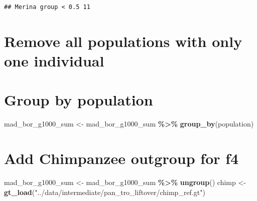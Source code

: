 \documentclass[
]{article}
\newenvironment{Shaded}{\begin{snugshade}}{\end{snugshade}}
\newcommand{\DecValTok}[1]{\textcolor[rgb]{0.00,0.00,0.81}{#1}}
\newcommand{\FunctionTok}[1]{\textcolor[rgb]{0.13,0.29,0.53}{\textbf{#1}}}
\newcommand{\NormalTok}[1]{#1}
\newcommand{\OtherTok}[1]{\textcolor[rgb]{0.56,0.35,0.01}{#1}}
\newcommand{\SpecialCharTok}[1]{\textcolor[rgb]{0.81,0.36,0.00}{\textbf{#1}}}
\newcommand{\StringTok}[1]{\textcolor[rgb]{0.31,0.60,0.02}{#1}}
\begin{document}
\begin{verbatim}
## Merina group < 0.5 11
\end{verbatim}

\section{Remove all populations with only one
individual}\label{remove-all-populations-with-only-one-individual-1}

\begin{Shaded}
\end{Shaded}

\section{Group by population}\label{group-by-population-1}

\begin{Shaded}
\begin{Highlighting}[]
\NormalTok{mad\_bor\_g1000\_sum }\OtherTok{\textless{}{-}}\NormalTok{ mad\_bor\_g1000\_sum }\SpecialCharTok{\%\textgreater{}\%} \FunctionTok{group\_by}\NormalTok{(population)}
\end{Highlighting}
\end{Shaded}

\section{Add Chimpanzee outgroup for
f4}\label{add-chimpanzee-outgroup-for-f4}

\begin{Shaded}
\begin{Highlighting}[]
\NormalTok{mad\_bor\_g1000\_sum }\OtherTok{\textless{}{-}}\NormalTok{ mad\_bor\_g1000\_sum }\SpecialCharTok{\%\textgreater{}\%} \FunctionTok{ungroup}\NormalTok{()}
\NormalTok{chimp }\OtherTok{\textless{}{-}} \FunctionTok{gt\_load}\NormalTok{(}\StringTok{"../data/intermediate/pan\_tro\_liftover/chimp\_ref.gt"}\NormalTok{)}
\end{Highlighting}
\end{Shaded}
\end{document}
